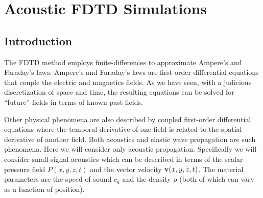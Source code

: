 \chapter{Acoustic FDTD Simulations \label{chap:acoustics}}


\renewcommand{\thefootnote}{\fnsymbol{footnote}}

\section{Introduction}

The FDTD method employs finite-differences to approximate Ampere's and
Faraday's laws.  Ampere's and Faraday's laws are first-order
differential equations that couple the electric and magnetics fields.
As we have seen, with a judicious discretization of space and time,
the resulting equations can be solved for ``future'' fields in terms
of known past fields.  

Other physical phenomena are also described by coupled first-order
differential equations where the temporal derivative of one field is
related to the spatial derivative of another field.  Both acoustics and
elastic wave propagation are such phenomena.  Here we will consider
only acoustic propagation.  Specifically we will consider small-signal
acoustics which can be described in terms of the scalar pressure field
$P(x,y,z,t)$ and the vector velocity $\mathbf{v}(x,y,z,t)$.  The material
parameters are the speed of sound $c_a$ and the density $\rho$ (both
of which can vary as a function of position).


